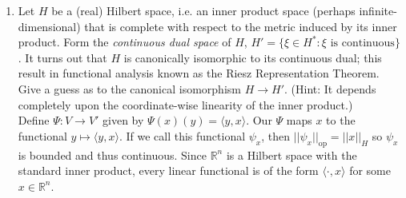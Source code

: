 \documentclass{article}
\begin{document}
\begin{enumerate}[label=\arabic*.]
	\item Let $H$ be a (real) Hilbert space, i.e. an inner product space (perhaps infinite-dimensional) that is complete with respect to the metric induced by its inner product. Form the \textit{continuous dual space} of $H$, $H' = \{\xi \in H^*: \xi \text{ is continuous} \}$. It turns out that $H$ is canonically isomorphic to its continuous dual; this result in functional analysis known as the Riesz Representation Theorem. Give a guess as to the canonical isomorphism $H \to H'$. (Hint: It depends completely upon the coordinate-wise linearity of the inner product.) \\
	{\color{blue} Define $\Psi: V \to V'$ given by $\Psi(x)(y) = \langle y, x\rangle$. Our $\Psi$ maps $x$ to the functional $y \mapsto \langle y,x\rangle$. If we call this functional $\psi_x$, then $||\psi_x||_\text{op} = ||x||_H$ so $\psi_x$ is bounded and thus continuous. Since $\mathbb{R}^n$ is a Hilbert space with the standard inner product, every linear functional is of the form $\langle \cdot, x \rangle$ for some $x \in \mathbb{R}^n$.}
\end{enumerate}
\end{document}
